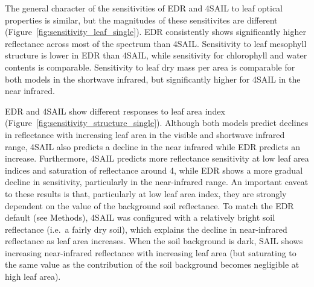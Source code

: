 
The general character of the sensitivities of EDR and 4SAIL to leaf optical properties is similar,
but the magnitudes of these sensitivites are different (Figure~\ref{fig:sensitivity_leaf_single}).
EDR consistently shows significantly higher reflectance across most of the spectrum than 4SAIL\@.
Sensitivity to leaf mesophyll structure is lower in EDR than 4SAIL, while sensitivity for chlorophyll and water contents is comparable.
Sensitivity to leaf dry mass per area is comparable for both models in the shortwave infrared, but significantly higher for 4SAIL in the near infrared.



EDR and 4SAIL show different responses to leaf area index (Figure~\ref{fig:sensitivity_structure_single}).
Although both models predict declines in reflectance with increasing leaf area in the visible and shortwave infrared range,
4SAIL also predicts a decline in the near infrared while EDR predicts an increase.
Furthermore, 4SAIL predicts more reflectance sensitivity at low leaf area indices and saturation of reflectance around 4, while EDR shows a more gradual decline in sensitivity, particularly in the near-infrared range. 
An important caveat to these results is that, particularly at low leaf area index, they are strongly dependent on the value of the background soil reflectance.
To match the EDR default (see Methods), 4SAIL was configured with a relatively bright soil reflectance (i.e.\ a fairly dry soil), which explains the decline in near-infrared reflectance as leaf area increases.
When the soil background is dark, SAIL shows increasing near-infrared reflectance with increasing leaf area (but saturating to the same value as the contribution of the soil background becomes negligible at high leaf area).

